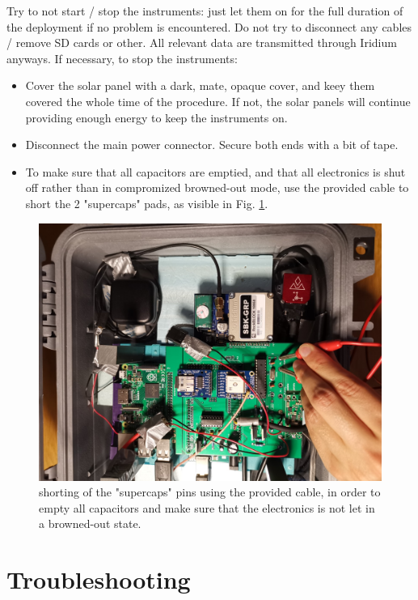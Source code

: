 \documentclass[pdftex,a4paper,12pt,twocolumn,fleqn,captions=tableheading]{scrartcl}
\begin{document}
Try to not start / stop the instruments: just let them on for the full duration of the deployment if no problem is encountered. Do not try to disconnect any cables / remove SD cards or other. All relevant data are transmitted through Iridium anyways. If necessary, to stop the instruments:

\begin{itemize}
  \item Cover the solar panel with a dark, mate, opaque cover, and keey them covered the whole time of the procedure. If not, the solar panels will continue providing enough energy to keep the instruments on.
  \item Disconnect the main power connector. Secure both ends with a bit of tape.
  \item To make sure that all capacitors are emptied, and that all electronics is shut off rather than in compromized browned-out mode, use the provided cable to short the 2 "supercaps" pads, as visible in Fig. \ref{shorting}.
\end{itemize}

  \begin{figure}
  \begin{center}
  \includegraphics[width=.8\textwidth]{Figures/shorting}
  \caption{\label{shorting} shorting of the "supercaps" pins using the provided cable, in order to empty all capacitors and make sure that the electronics is not let in a browned-out state.}
  \end{center}
  \end{figure}

\section{Troubleshooting}
\end{document}
